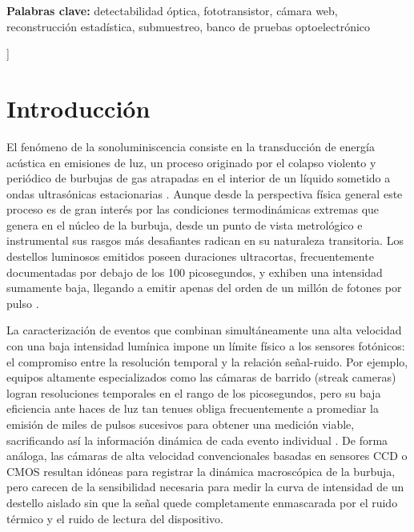 \documentclass[10pt,a4paper,twocolumn]{article}
\begin{document}
\begin{@twocolumnfalse}
    \vspace{0.3cm}
    
    \textbf{Palabras clave:} detectabilidad óptica, fototransistor, cámara web, reconstrucción estadística, submuestreo, banco de pruebas optoelectrónico
    
    \vspace{1cm}
  \end{@twocolumnfalse}
]

\section{Introducción}

El fenómeno de la sonoluminiscencia consiste en la transducción de energía acústica en emisiones de luz, un proceso originado por el colapso violento y periódico de burbujas de gas atrapadas en el interior de un líquido sometido a ondas ultrasónicas estacionarias \cite{gaitan1992, brenner2002}. Aunque desde la perspectiva física general este proceso es de gran interés por las condiciones termodinámicas extremas que genera en el núcleo de la burbuja, desde un punto de vista metrológico e instrumental sus rasgos más desafiantes radican en su naturaleza transitoria. Los destellos luminosos emitidos poseen duraciones ultracortas, frecuentemente documentadas por debajo de los 100 picosegundos, y exhiben una intensidad sumamente baja, llegando a emitir apenas del orden de un millón de fotones por pulso \cite{barber1992, gompf1997}.

La caracterización de eventos que combinan simultáneamente una alta velocidad con una baja intensidad lumínica impone un límite físico a los sensores fotónicos: el compromiso entre la resolución temporal y la relación señal-ruido. Por ejemplo, equipos altamente especializados como las cámaras de barrido (streak cameras) logran resoluciones temporales en el rango de los picosegundos, pero su baja eficiencia ante haces de luz tan tenues obliga frecuentemente a promediar la emisión de miles de pulsos sucesivos para obtener una medición viable, sacrificando así la información dinámica de cada evento individual \cite{pecha2000}. De forma análoga, las cámaras de alta velocidad convencionales basadas en sensores CCD o CMOS resultan idóneas para registrar la dinámica macroscópica de la burbuja, pero carecen de la sensibilidad necesaria para medir la curva de intensidad de un destello aislado sin que la señal quede completamente enmascarada por el ruido térmico y el ruido de lectura del dispositivo.
\end{document}
